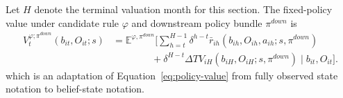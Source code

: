 \documentclass[11pt]{article}
\newcommand{\E}{\mathbb{E}}
\newcommand{\1}{\mathbf{1}}
\begin{document}
Let $H$ denote the terminal valuation month for this section. The fixed-policy
value under candidate rule $\varphi$ and downstream policy bundle $\pi^{down}$ is
\begin{equation}
  \begin{split}
  V_t^{\varphi;\pi^{down}}(b_{it},O_{it};s)
  &=
  \E^{\varphi,\pi^{down}}\!\Biggl[
    \sum_{h=t}^{H-1}\delta^{h-t}
      \bar r_{ih}(b_{ih},O_{ih},a_{ih};s,\pi^{down}) \\
  &\qquad\qquad
    + \delta^{H-t}\Delta TV_{iH}(b_{iH},O_{iH};s,\pi^{down})
    \mid b_{it},O_{it}
  \Biggr].
  \end{split}
  \label{eq:ss-policy-value}
\end{equation}
which is an adaptation of Equation~\eqref{eq:policy-value} from fully observed
state notation to belief-state notation.
\end{document}
